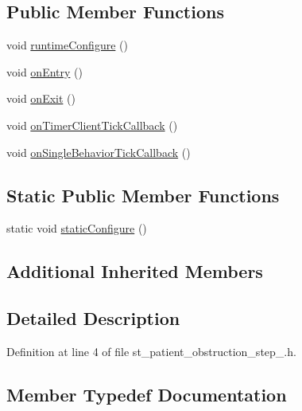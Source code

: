 \subsection*{Public Member Functions}
\begin{DoxyCompactItemize}
\item 
void \hyperlink{structsm__respira__1_1_1StPatientObstructionStep1_a99ac90de739317e8c0c47916fafd057a}{runtime\+Configure} ()
\item 
void \hyperlink{structsm__respira__1_1_1StPatientObstructionStep1_abf880550f32fc9a0013f72862b08b585}{on\+Entry} ()
\item 
void \hyperlink{structsm__respira__1_1_1StPatientObstructionStep1_a9db651db42809f269204c64762f3bad8}{on\+Exit} ()
\item 
void \hyperlink{structsm__respira__1_1_1StPatientObstructionStep1_a330f5d86b827dedd1ca72d7356215c49}{on\+Timer\+Client\+Tick\+Callback} ()
\item 
void \hyperlink{structsm__respira__1_1_1StPatientObstructionStep1_a87a086647c2ec7b38f86f17d2719c89b}{on\+Single\+Behavior\+Tick\+Callback} ()
\end{DoxyCompactItemize}
\subsection*{Static Public Member Functions}
\begin{DoxyCompactItemize}
\item 
static void \hyperlink{structsm__respira__1_1_1StPatientObstructionStep1_a935f38ebd60546b7c6e03655d041206d}{static\+Configure} ()
\end{DoxyCompactItemize}
\subsection*{Additional Inherited Members}


\subsection{Detailed Description}


Definition at line 4 of file st\+\_\+patient\+\_\+obstruction\+\_\+step\+\_.\+h.



\subsection{Member Typedef Documentation}
